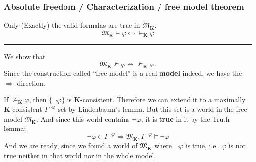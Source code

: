 \documentclass[xcolor=x11names]{beamer}
\renewcommand{\emph}[1]{\textbf{#1}}
\begin{document}


\begin{frame}
\frametitle{Absolute freedom / Characterization / free model theorem}
Only (Exactly) the valid formulas are true in $\mathfrak M_{\mathbf K}$.
\[ \mathfrak M_{\mathbf K} \models \varphi \iff \models_\mathbf K  \varphi \]
\hrule

\medskip

We show that
\[ \mathfrak M_{\mathbf K} \not\models \varphi \iff \not\models_\mathbf K  \varphi .\]
Since the construction called ``free model'' is a real \emph{model} indeed, we have the $\Rightarrow$ direction.

If $\not\models_\mathbf K \varphi$, then $\{\lnot \varphi\}$ is $\mathbf K$-consistent. Therefore we can extend it to a maximally $\mathbf K$-consistent $\Gamma^{\lnot \varphi}$ set by Lindenbaum's lemma. But this set is a world in the free model $\mathfrak M_\mathbf K$. And since this world contains $\lnot \varphi$, it is \emph{true} in it by the Truth lemma:
\[ \lnot \varphi \in \Gamma ^{\lnot \varphi} \Longrightarrow \mathfrak M _{\mathbf K} , \Gamma^{\lnot \varphi} \models \lnot \varphi \]
And we are ready, since we found a world of $\mathfrak M_\mathbf K$ where $\lnot \varphi$ is true, i.e., $\varphi$ is not true neither in that world nor in the whole model.

\end{frame}

\end{document}

